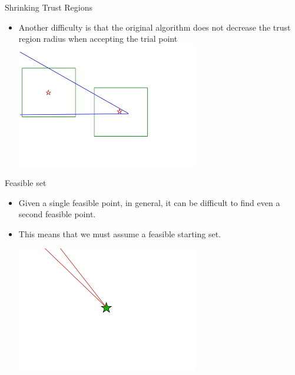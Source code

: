\documentclass{beamer}
\begin{document}
\begin{frame}{Shrinking Trust Regions}

\begin{itemize}
    \item Another difficulty is that the original algorithm does not decrease the trust region radius when accepting the trial point
    \includegraphics[width=300px]{images/decrease_required.png}
\end{itemize}
\end{frame}



\begin{frame}{Feasible set}
\begin{itemize}
	\item Given a single feasible point, in general, it can be difficult to find even a second feasible point.
	\item This means that we must assume a feasible starting set.
	\begin{center}
		\includegraphics[width=300px]{images/only_one_feasible_point.png}
	\end{center}
\end{itemize}
\end{frame}
\end{document}
